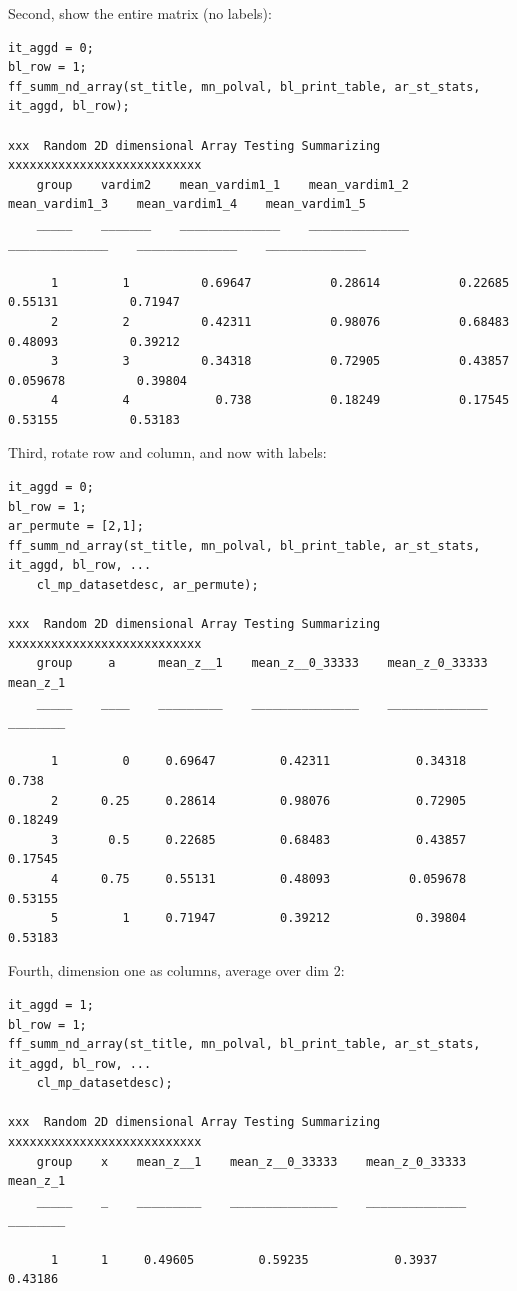 \documentclass[
]{book}
\begin{document}
Second, show the entire matrix (no labels):

\begin{verbatim}
it_aggd = 0; 
bl_row = 1; 
ff_summ_nd_array(st_title, mn_polval, bl_print_table, ar_st_stats, it_aggd, bl_row);

xxx  Random 2D dimensional Array Testing Summarizing  xxxxxxxxxxxxxxxxxxxxxxxxxxx
    group    vardim2    mean_vardim1_1    mean_vardim1_2    mean_vardim1_3    mean_vardim1_4    mean_vardim1_5
    _____    _______    ______________    ______________    ______________    ______________    ______________

      1         1          0.69647           0.28614           0.22685            0.55131          0.71947    
      2         2          0.42311           0.98076           0.68483            0.48093          0.39212    
      3         3          0.34318           0.72905           0.43857           0.059678          0.39804    
      4         4            0.738           0.18249           0.17545            0.53155          0.53183    
\end{verbatim}

Third, rotate row and column, and now with labels:

\begin{verbatim}
it_aggd = 0; 
bl_row = 1; 
ar_permute = [2,1];
ff_summ_nd_array(st_title, mn_polval, bl_print_table, ar_st_stats, it_aggd, bl_row, ...
    cl_mp_datasetdesc, ar_permute);

xxx  Random 2D dimensional Array Testing Summarizing  xxxxxxxxxxxxxxxxxxxxxxxxxxx
    group     a      mean_z__1    mean_z__0_33333    mean_z_0_33333    mean_z_1
    _____    ____    _________    _______________    ______________    ________

      1         0     0.69647         0.42311            0.34318         0.738 
      2      0.25     0.28614         0.98076            0.72905       0.18249 
      3       0.5     0.22685         0.68483            0.43857       0.17545 
      4      0.75     0.55131         0.48093           0.059678       0.53155 
      5         1     0.71947         0.39212            0.39804       0.53183 
\end{verbatim}

Fourth, dimension one as columns, average over dim 2:

\begin{verbatim}
it_aggd = 1; 
bl_row = 1; 
ff_summ_nd_array(st_title, mn_polval, bl_print_table, ar_st_stats, it_aggd, bl_row, ...
    cl_mp_datasetdesc);

xxx  Random 2D dimensional Array Testing Summarizing  xxxxxxxxxxxxxxxxxxxxxxxxxxx
    group    x    mean_z__1    mean_z__0_33333    mean_z_0_33333    mean_z_1
    _____    _    _________    _______________    ______________    ________

      1      1     0.49605         0.59235            0.3937        0.43186 
\end{verbatim}
\end{document}
